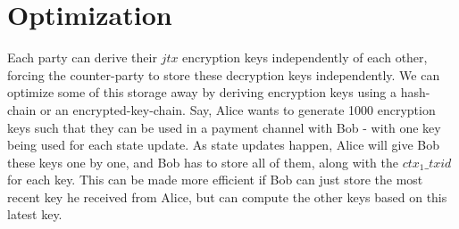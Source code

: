 \section{Optimization}
Each party can derive their $\mathit{jtx}$ encryption keys independently of each other, forcing the counter-party to store these decryption keys independently. We can optimize some of this storage away by deriving encryption keys using a hash-chain or an encrypted-key-chain. Say, Alice wants to generate 1000 encryption keys such that they can be used in a payment channel with Bob - with one key being used for each state update. As state updates happen, Alice will give Bob these keys one by one, and Bob has to store all of them, along with the $\mathit{ctx_1\_txid}$ for each key. This can be made more efficient if Bob can just store the most recent key he received from Alice, but can compute the other keys based on this latest key. 

